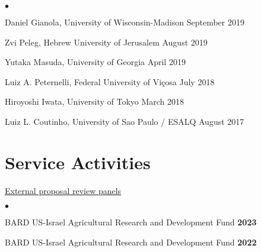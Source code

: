 \documentclass[margin,line,10pt]{res}
\newenvironment{list2}{
  \begin{list}{$\bullet$}{%
      \setlength{\itemsep}{0in}
      \setlength{\parsep}{0in} \setlength{\parskip}{0in}
      \setlength{\topsep}{0in} \setlength{\partopsep}{0in} 
      \setlength{\leftmargin}{0.2in}}}{\end{list}}
\begin{document}
\begin{resume}
\begin{list2}
\item Daniel Gianola, University of Wisconsin-Madison  \hfill September 2019\\

\item Zvi Peleg, Hebrew University of Jerusalem   \hfill August 2019\\

\item Yutaka Masuda, University of Georgia \hfill April 2019\\

\item Luiz A. Peternelli, Federal University of Vi\c cosa  \hfill July 2018\\

\item Hiroyoshi Iwata, University of Tokyo  \hfill March 2018\\
    
\item Luiz L. Coutinho, University of Sao Paulo / ESALQ  \hfill August 2017\\


\end{list2}












\vspace{0.5cm}
\section{\sc Service Activities}


\begin{flushleft}
  \hspace{0.3cm} \underline{External proposal review panels}
  \end{flushleft}


  \begin{list2}
    \item BARD US-Israel Agricultural Research and Development Fund \hfill \textbf{2023}  \\
  
    \vspace{0.3cm}

    \item BARD US-Israel Agricultural Research and Development Fund \hfill \textbf{2022}  \\
  

\end{list2}
\end{resume}
\end{document}
